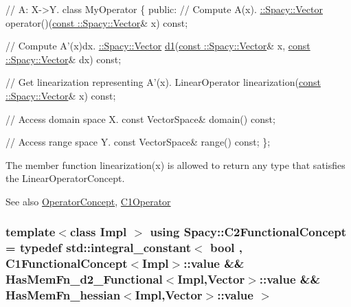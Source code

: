 \begin{DoxyCode}
\textcolor{comment}{// A: X->Y.}
\textcolor{keyword}{class }MyOperator
\{
\textcolor{keyword}{public}:
  \textcolor{comment}{// Compute A(x).}
  \hyperlink{classSpacy_1_1Vector}{::Spacy::Vector} operator()(\hyperlink{group__VectorSpaceGroup_gafda42fd5aa3f7597a42b9831bf4dfd07}{const ::Spacy::Vector}& x) \textcolor{keyword}{const};

  \textcolor{comment}{// Compute A'(x)dx.}
  \hyperlink{classSpacy_1_1Vector}{::Spacy::Vector} \hyperlink{namespaceSpacy_ab6646eb7068eb9f1369e639cf0b620a2}{d1}(\hyperlink{group__VectorSpaceGroup_gafda42fd5aa3f7597a42b9831bf4dfd07}{const ::Spacy::Vector}& x, 
      \hyperlink{group__VectorSpaceGroup_gafda42fd5aa3f7597a42b9831bf4dfd07}{const ::Spacy::Vector}& dx) \textcolor{keyword}{const};

  \textcolor{comment}{// Get linearization representing A'(x).}
 LinearOperator linearization(\hyperlink{group__VectorSpaceGroup_gafda42fd5aa3f7597a42b9831bf4dfd07}{const ::Spacy::Vector}& x) \textcolor{keyword}{const};

  \textcolor{comment}{// Access domain space X.}
  \textcolor{keyword}{const} VectorSpace& domain() \textcolor{keyword}{const};

  \textcolor{comment}{// Access range space Y.}
  \textcolor{keyword}{const} VectorSpace& range() \textcolor{keyword}{const};
\};
\end{DoxyCode}


The member function {\ttfamily linearization(x)} is allowed to return any type that satisfies the Linear\+Operator\+Concept.

\begin{DoxySeeAlso}{See also}
\hyperlink{group__ConceptGroup_ga0cd6ba53feff75abbb6822b45fd6265e}{Operator\+Concept}, \hyperlink{classSpacy_1_1C1Operator}{C1\+Operator} 
\end{DoxySeeAlso}
\hypertarget{group__ConceptGroup_ga265f0821ce6e0688d6e9abb8d8e0af6a}{}
\subsubsection[{C2\+Functional\+Concept}]{\setlength{\rightskip}{0pt plus 5cm}template$<$class Impl $>$ using {\bf Spacy\+::\+C2\+Functional\+Concept} = typedef std\+::integral\+\_\+constant$<$ bool , C1\+Functional\+Concept$<$Impl$>$\+::value \&\& Has\+Mem\+Fn\+\_\+d2\+\_\+\+Functional$<$Impl,Vector$>$\+::value \&\& Has\+Mem\+Fn\+\_\+hessian$<$Impl,Vector$>$\+::value $>$}\label{group__ConceptGroup_ga265f0821ce6e0688d6e9abb8d8e0af6a}
\label{group__ConceptGroup_C2FunctionalConceptAnchor}%
\hypertarget{group__ConceptGroup_C2FunctionalConceptAnchor}{}%
 
